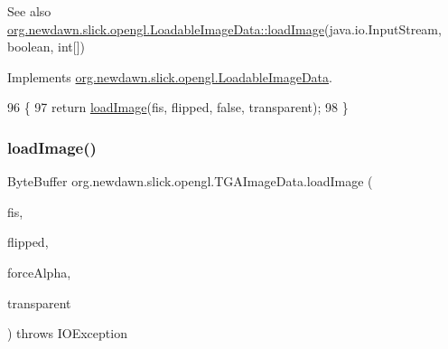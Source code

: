 \begin{DoxySeeAlso}{See also}
\mbox{\hyperlink{interfaceorg_1_1newdawn_1_1slick_1_1opengl_1_1_loadable_image_data_a640021b955dde7deeeeabb5ac3738d2b}{org.\+newdawn.\+slick.\+opengl.\+Loadable\+Image\+Data\+::load\+Image}}(java.\+io.\+Input\+Stream, boolean, int\mbox{[}\mbox{]}) 
\end{DoxySeeAlso}


Implements \mbox{\hyperlink{interfaceorg_1_1newdawn_1_1slick_1_1opengl_1_1_loadable_image_data_a448a235d1058316349f513a69f593d9b}{org.\+newdawn.\+slick.\+opengl.\+Loadable\+Image\+Data}}.


\begin{DoxyCode}
96                                                                                                         \{
97         \textcolor{keywordflow}{return} \mbox{\hyperlink{classorg_1_1newdawn_1_1slick_1_1opengl_1_1_t_g_a_image_data_a9ac907fe85767aad15fa1c05af8fb093}{loadImage}}(fis, flipped, \textcolor{keyword}{false}, transparent);
98     \}
\end{DoxyCode}
\mbox{\label{classorg_1_1newdawn_1_1slick_1_1opengl_1_1_t_g_a_image_data_a45d077de182a890729f2e9cf9e408520}} 
\subsubsection{\texorpdfstring{load\+Image()}{loadImage()}\hspace{0.1cm}{\footnotesize\ttfamily [3/3]}}
{\footnotesize\ttfamily Byte\+Buffer org.\+newdawn.\+slick.\+opengl.\+T\+G\+A\+Image\+Data.\+load\+Image (\begin{DoxyParamCaption}\item[{Input\+Stream}]{fis,  }\item[{boolean}]{flipped,  }\item[{boolean}]{force\+Alpha,  }\item[{int \mbox{[}$\,$\mbox{]}}]{transparent }\end{DoxyParamCaption}) throws I\+O\+Exception\hspace{0.3cm}{\ttfamily [inline]}}

